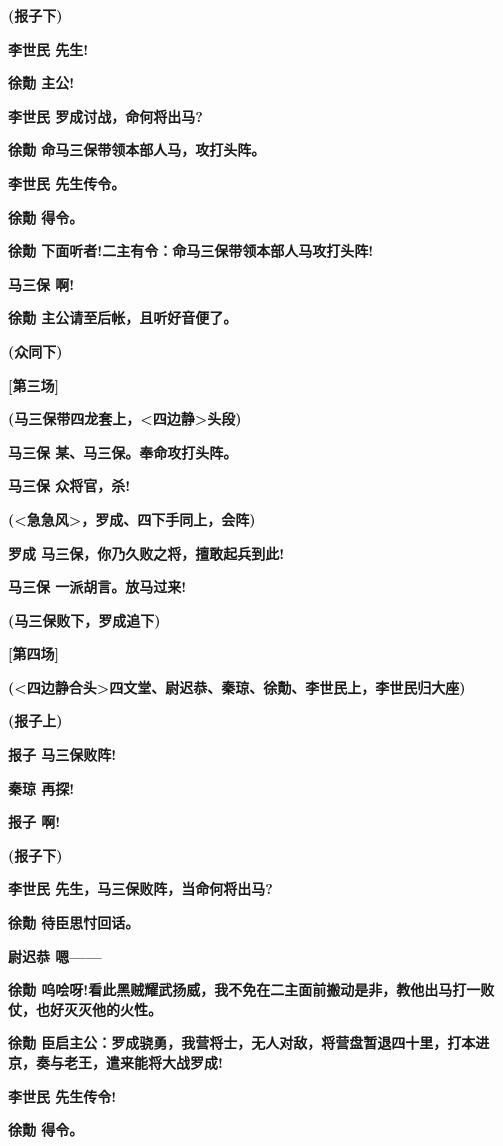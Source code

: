 \textbf{(报子下)}

\textbf{李世民 先生!}

\textbf{徐勣 主公!}

\textbf{李世民 罗成讨战，命何将出马?}

\textbf{徐勣 命马三保带领本部人马，攻打头阵。}

\textbf{李世民 先生传令。}

\textbf{徐勣 得令。}

\textbf{徐勣 下面听者!二主有令：命马三保带领本部人马攻打头阵!}

\textbf{马三保 啊!}

\textbf{徐勣 主公请至后帐，且听好音便了。}

\textbf{(众同下)}

\textbf{{[}第三场{]}}

\textbf{(马三保带四龙套上，\textless{}四边静\textgreater{}头段)}

\textbf{马三保 某、马三保。奉命攻打头阵。}

\textbf{马三保 众将官，杀!}

\textbf{(\textless{}急急风\textgreater{}，罗成、四下手同上，会阵)}

\textbf{罗成 马三保，你乃久败之将，擅敢起兵到此!}

\textbf{马三保 一派胡言。放马过来!}

\textbf{(马三保败下，罗成追下)}

\textbf{{[}第四场{]}}

\textbf{(\textless{}四边静合头\textgreater{}四文堂、尉迟恭、秦琼、徐勣、李世民上，李世民归大座)}

\textbf{(报子上)}

\textbf{报子 马三保败阵!}

\textbf{秦琼 再探!}

\textbf{报子 啊!}

\textbf{(报子下)}

\textbf{李世民 先生，马三保败阵，当命何将出马?}

\textbf{徐勣 待臣思忖回话。}

\textbf{尉迟恭 嗯------}

\textbf{徐勣
呜哙呀!看此黑贼耀武扬威，我不免在二主面前搬动是非，教他出马打一败仗，也好灭灭他的火性。}

\textbf{徐勣
臣启主公：罗成骁勇，我营将士，无人对敌，将营盘暂退四十里，打本进京，奏与老王，遣来能将大战罗成!}

\textbf{李世民 先生传令!}

\textbf{徐勣 得令。}

